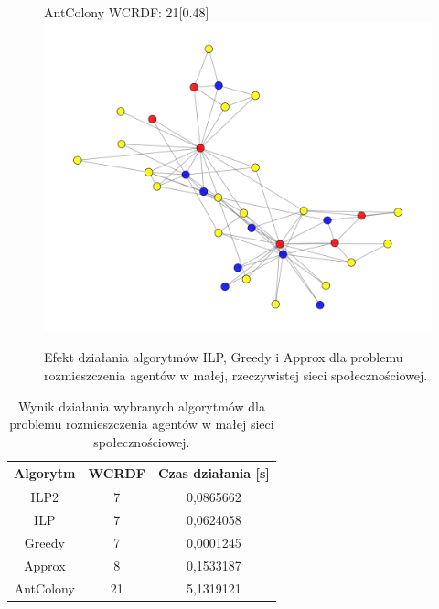 \begin{figure}[htbp]
\begin{subcaptionbox}{AntColony  WCRDF: 21\label{fig:ant}}[0.48\linewidth]
        {\includegraphics[width=\linewidth]{assets/Facebook/ant.png}}
    \end{subcaptionbox}

    \caption{Efekt działania algorytmów ILP, Greedy i Approx dla problemu rozmieszczenia agentów w małej, rzeczywistej sieci społecznościowej.}
    \label{fig:karate}
\end{figure}

\begin{table}[H]
    \centering
    \begin{tabular}{|c|c|c|}
        \hline
    Algorytm & WCRDF & Czas działania [s] \\     \hline
    ILP2 & 7 & 0,0865662 \\ \hline
    ILP & 7 & 0,0624058 \\ \hline
    Greedy & 7 & 0,0001245 \\ \hline
    Approx & 8 & 0,1533187 \\ \hline 
    AntColony & 21 & 5,1319121 \\ \hline
\end{tabular}
\caption{Wynik działania wybranych algorytmów dla problemu rozmieszczenia agentów w małej sieci społecznościowej.}
\end{table}

